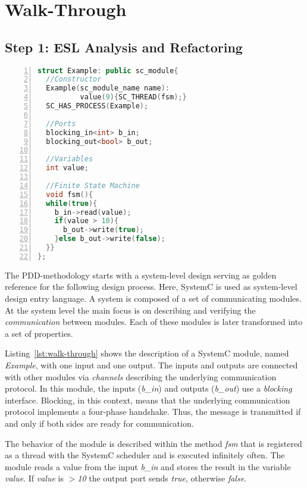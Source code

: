 \section{Walk-Through}
\label{sec:walk-through}

\subsection{Step 1: ESL Analysis and Refactoring}
\label{sec:walk-through-step1}

\begin{lstlisting}[language=C++,
caption={Example of a SystemC module},
label={lst:walk-through},
numbers=left,
captionpos=b,   
basicstyle={\footnotesize},
xleftmargin=5.0ex]
struct Example: public sc_module{
  //Constructor
  Example(sc_module_name name):
          value(9){SC_THREAD(fsm);}
  SC_HAS_PROCESS(Example);

  //Ports
  blocking_in<int> b_in;
  blocking_out<bool> b_out;

  //Variables
  int value;

  //Finite State Machine
  void fsm(){
  while(true){
    b_in->read(value);
    if(value > 10){
      b_out->write(true);
    }else b_out->write(false);
  }}
};
\end{lstlisting}

The PDD-methodology starts with a system-level design serving as golden reference for the following design process. %
Here, SystemC is used as system-level design entry language. %
A system is composed of a set of communicating modules. %
At the system level the main focus is on describing and verifying the \emph{communication} between modules. 
Each of these modules is later transformed into a set of properties. %

Listing~\ref{lst:walk-through} shows the description of a SystemC module, named \textit{Example}, with one input and one output. %
The inputs and outputs are connected with other modules via \emph{channels} describing the underlying communication protocol. %
In this module, the inputs (\textit{b\_in}) and outputs (\textit{b\_out}) use a \textit{blocking} interface. %
Blocking, in this context, means that the underlying communication protocol implements a four-phase handshake. %
Thus, the message is transmitted if and only if both sides are ready for communication. %

The behavior of the module is described within the method \textit{fsm}
that is registered as a thread with the SystemC scheduler and is
executed infinitely often. %
The module reads a value from the input \textit{b\_in} and stores the
result in the variable \textit{value}. %
If \textit{value} is $>$\textit{10} the output port sends
\textit{true}, otherwise \textit{false}. %


